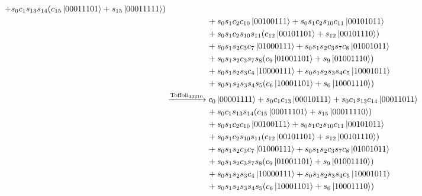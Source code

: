 \documentclass[11pt, oneside]{article}   	%
\begin{document}
\begin{align*}
+ s_0 c_1 s_{13} s_{14} (c_{15} \ket{00011101} + s_{15} \ket{00011111}) \\
& \hspace{5em} 
+ s_0 s_1 c_2 c_{10} \ket{00100111} 
+ s_0 s_1 c_2 s_{10} c_{11} \ket{00101011} \\
& \hspace{5em} 
+ s_0 s_1 c_2 s_{10} s_{11} (c_{12} \ket{00101101} + s_{12} \ket{00101110}) \\
& \hspace{5em} 
+ s_0 s_1 s_2 c_3 c_7 \ket{01000111}
+ s_0 s_1 s_2 c_3 s_7 c_8 \ket{01001011} \\
& \hspace{5em} 
+ s_0 s_1 s_2 c_3 s_7 s_8 (c_9 \ket{01001101} + s_9 \ket{01001110}) \\
& \hspace{5em} 
+ s_0 s_1 s_2 s_3 c_4 \ket{10000111}
+ s_0 s_1 s_2 s_3 s_4 c_5 \ket{10001011} \\
& \hspace{5em} 
+ s_0 s_1 s_2 s_3 s_4 s_5 (c_6 \ket{10001101} + s_6 \ket{10001110} ) \\
&\xrightarrow{\text{Toffoli}_{43210}} 
c_0 \ket{00001111} 
+ s_0 c_1 c_{13} \ket{00010111}
+ s_0 c_1 s_{13} c_{14} \ket{00011011} \\
& \hspace{5em} 
+ s_0 c_1 s_{13} s_{14} (c_{15} \ket{00011101} + s_{15} \ket{00011110}) \\
& \hspace{5em} 
+ s_0 s_1 c_2 c_{10} \ket{00100111} 
+ s_0 s_1 c_2 s_{10} c_{11} \ket{00101011} \\
& \hspace{5em} 
+ s_0 s_1 c_2 s_{10} s_{11} (c_{12} \ket{00101101} + s_{12} \ket{00101110}) \\
& \hspace{5em} 
+ s_0 s_1 s_2 c_3 c_7 \ket{01000111}
+ s_0 s_1 s_2 c_3 s_7 c_8 \ket{01001011} \\
& \hspace{5em} 
+ s_0 s_1 s_2 c_3 s_7 s_8 (c_9 \ket{01001101} + s_9 \ket{01001110}) \\
& \hspace{5em} 
+ s_0 s_1 s_2 s_3 c_4 \ket{10000111}
+ s_0 s_1 s_2 s_3 s_4 c_5 \ket{10001011} \\
& \hspace{5em} 
+ s_0 s_1 s_2 s_3 s_4 s_5 (c_6 \ket{10001101} + s_6 \ket{10001110} ) \\
\end{align*}
\end{document}
